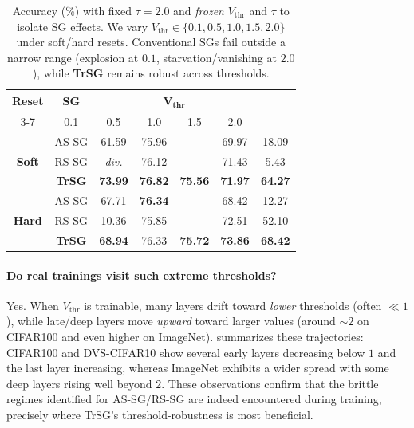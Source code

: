 \begin{table}[t]
\centering
\small
\begin{tabular}{cc|ccccc}
\toprule
\textbf{Reset} & \textbf{SG} & \multicolumn{4}{c}{\(\boldsymbol{V_{\text{thr}}}\)} \\
\cmidrule(lr){3-7}
\multicolumn{2}{c|}{} & 0.1 & 0.5 & 1.0 & 1.5 & 2.0 \\
\midrule
\multirow{3}{*}{\textbf{Soft}} 
  & AS-SG        & 61.59 & 75.96 & ---  & 69.97  & 18.09 \\
  & RS-SG        & \emph{div.} & 76.12 & ---   & 71.43  & 5.43 \\
  & \textbf{TrSG}  & \textbf{73.99} & \textbf{76.82} & \textbf{75.56} & \textbf{71.97}  & \textbf{64.27} \\
\midrule
\multirow{3}{*}{\textbf{Hard}} 
  & AS-SG        & 67.71   & \textbf{76.34} & ---   & 68.42  & 12.27 \\
  & RS-SG        & 10.36   & 75.85 & ---   & 72.51  & 52.10 \\
  & \textbf{TrSG}  & \textbf{68.94}   & 76.33 & \textbf{75.72} & \textbf{73.86}  & \textbf{68.42} \\
\bottomrule
\end{tabular}
\caption{
Accuracy (\%) with fixed $\tau{=}2.0$ and \emph{frozen} $V_{\text{thr}}$ and $\tau$ to isolate SG effects. 
We vary $V_{\text{thr}}\!\in\!\{0.1,0.5,1.0,1.5,2.0\}$ under soft/hard resets. 
Conventional SGs fail outside a narrow range (explosion at $0.1$, starvation/vanishing at $2.0$), while \textbf{TrSG} remains robust across thresholds.}
\label{tab:no_training_results}
\end{table}

\paragraph{Do real trainings visit such extreme thresholds?}
Yes. When $V_{\text{thr}}$ is trainable, many layers drift toward \emph{lower} thresholds (often $\ll1$), while late/deep layers move \emph{upward} toward larger values (around $\sim 2$ on CIFAR100 and even higher on ImageNet). 
 summarizes these trajectories: CIFAR100 and DVS-CIFAR10 show several early layers decreasing below $1$ and the last layer increasing, whereas ImageNet exhibits a wider spread with some deep layers rising well beyond $2$. 
These observations confirm that the brittle regimes identified for AS-SG/RS-SG are indeed encountered during training, precisely where TrSG’s threshold-robustness is most beneficial.


